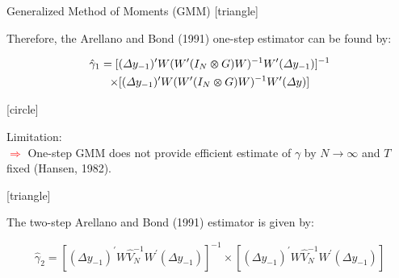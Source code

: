 \documentclass{beamer}
\begin{document}
\begin{frame}{Generalized Method of Moments (GMM)}
\vspace{-66pt} \flushright \hyperlink{Main4}{\beamerbutton{\textcolor{red}{Back}}}
[triangle]

\vspace{40pt}
\begin{itemize} 
{\scriptsize\item Therefore, the Arellano and Bond (1991) one-step estimator can be found by:}

\vspace{-10pt}
\begin{scriptsize}
\begin{multline} \label{eq:GMM-AB-OneStep}
\hat{\gamma}_1 = [(\Delta y_{-1})^{\prime} W(W^{\prime}(I_N \varotimes G)W)^{-1}W^{\prime}(\Delta y_{-1})]^{-1} \\ \times [(\Delta y_{-1})^{\prime} W(W^{\prime}(I_N \varotimes G)W)^{-1}W^{\prime}(\Delta y)]
\end{multline}
\end{scriptsize}
\end{itemize}


\vspace{-5pt}
[circle]
\begin{itemize}
{\scriptsize\item Limitation: \vspace{-8pt}
\\ \tiny\textcolor{red}{$\Longrightarrow$} One-step GMM does not provide efficient estimate of $\gamma$ by ${N\to\infty}$ and $T$ fixed (Hansen, 1982).}
\end{itemize}


\vspace{20pt}
[triangle]
\begin{itemize} 
{\scriptsize\item The two-step Arellano and Bond (1991) estimator is given by:}

\begin{scriptsize}
\begin{equation} \label{eq:GMM-AB-TwoStep}
\hat{\gamma}_2 = [(\Delta y_{-1})^{\prime} W\hat{V}_N^{-1}W^{\prime}(\Delta y_{-1})]^{-1} \times [(\Delta y_{-1})^{\prime} W\hat{V}_N^{-1}W^{\prime}(\Delta y_{-1})]
\end{equation}
\end{scriptsize}
\end{itemize}
\end{frame}
\end{document}
